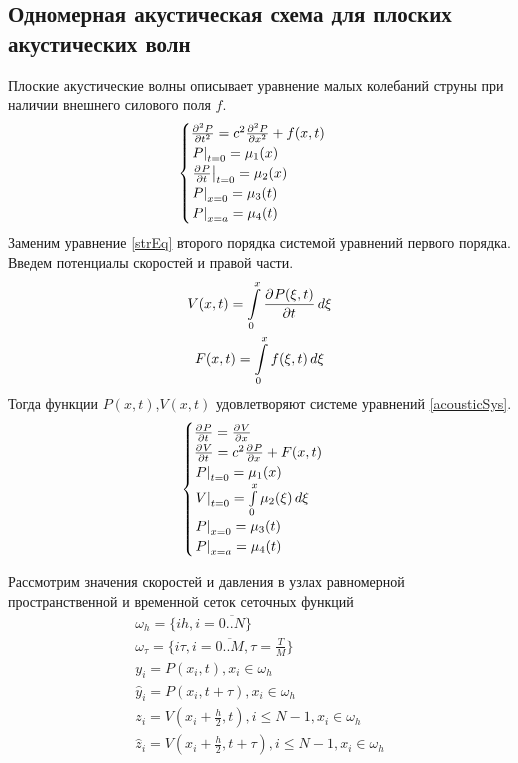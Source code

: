 \documentclass[a4paper, fontsize=14pt]{article} \usepackage{course_work} 
\begin{document}
\subsection{Одномерная акустическая схема для плоских акустических волн}
Плоские акустические волны описывает уравнение малых колебаний струны при наличии внешнего силового
поля $f$.
\begin{equation}
    \label{strEq}
    \begin{cases}
        \diff[2]{P}{t} = c^2 \diff[2]{P}{x} + f(x,t)\\
        \subs{t=0}{P} = \mu_1(x)\\
        \subs{t=0}{\diff{P}{t}} = \mu_2(x)\\
        \subs{x=0}{P} = \mu_3(t)\\
        \subs{x=a}{P} = \mu_4(t)\\
    \end{cases}
\end{equation}
Заменим уравнение \ref{strEq} второго порядка системой уравнений первого порядка. Введем потенциалы скоростей и
правой части.
\begin{gather*}
    V(x,t) = \int \limits_0^x \frac{\partial ^ {  } P(\xi,t)}{\partial t ^ {  } } \,d\xi\\
    F(x,t) = \int \limits_0^x f(\xi,t) \,d\xi
\end{gather*}
Тогда функции $P(x,t)$,$V(x,t)$ удовлетворяют системе уравнений \ref{acousticSys}. 
\begin{equation}
    \label{acousticSys}
    \begin{cases}
        \diff{P}{t} = \diff{V}{x}\\
        \diff{V}{t} = c^2 \diff{P}{x} + F(x,t)\\
        \subs{t=0}{P} = \mu_1(x)\\
        \subs{t=0}{V} = \int \limits_0^x \mu_2(\xi) \,d\xi\\
        \subs{x=0}{P} = \mu_3(t)\\
        \subs{x=a}{P} = \mu_4(t)\\
    \end{cases}
\end{equation}

Рассмотрим значения скоростей и давления в узлах равномерной пространственной и временной сеток
сеточных функций 
\begin{gather*}
    \omega_h =\{ih, i=\overline{0..N}\} \\ 
    \omega_\tau =\{i\tau,i=\overline{0..M},\tau = \frac{T}{M}\}\\
    y_i = P(x_i,t), x_i \in \omega_h\\
    \hat{y}_i = P(x_i,t+\tau), x_i \in \omega_h\\
    z_i = V\left(x_i+\frac{h}{2},t\right), i \leq N-1,x_i\in \omega_h\\
    \hat{z}_i = V\left(x_i+\frac{h}{2},t+\tau\right), i \leq N-1,x_i\in \omega_h\\
\end{gather*}
\end{document}
